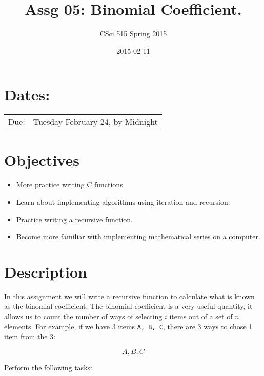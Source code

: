 \documentclass[11pt]{article}
\title{Assg 05: Binomial Coefficient.}
\author{CSci 515 Spring 2015}
\date{2015-02-11}
\begin{document}
\maketitle


\section*{Dates:}
\label{sec-1}


\begin{center}
\begin{tabular}{ll}
 Due:  &  Tuesday February 24, by Midnight  \\
\end{tabular}
\end{center}
\section*{Objectives}
\label{sec-2}

\begin{itemize}
\item More practice writing C functions
\item Learn about implementing algorithms using iteration and recursion.
\item Practice writing a recursive function.
\item Become more familiar with implementing mathematical series on a computer.
\end{itemize}
\section*{Description}
\label{sec-3}

In this assignment we will write a recursive function to calculate what
is known as the binomial coefficient.  The binomial coefficient is a very
useful quantity, it allows us to count the number of ways of selecting
$i$ items out of a set of $n$ elements.  For example, if we
have $3$ items \verb~A, B, C~, there are 3 ways to chose 1 item from the 3:

$$
A, B, C
$$



Perform the following tasks:
\end{document}
